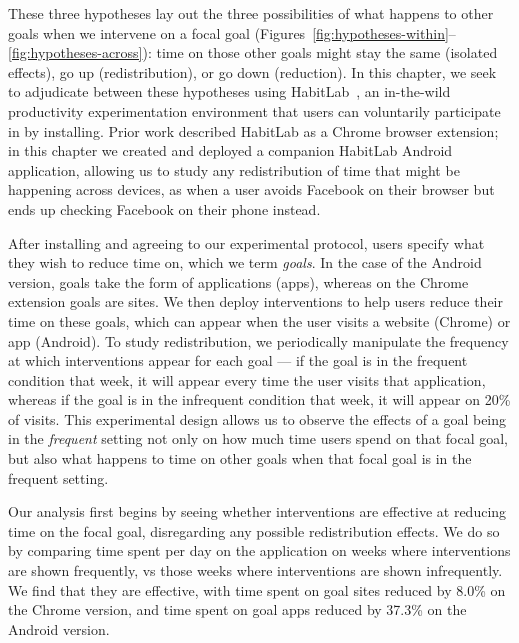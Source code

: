 These three hypotheses lay out the three possibilities of what happens to other goals when we intervene on a focal goal (Figures~\ref{fig:hypotheses-within}--\ref{fig:hypotheses-across}): time on those other goals might stay the same (isolated effects), go up (redistribution), or go down (reduction). In this chapter, we seek to adjudicate between these hypotheses using  HabitLab~\cite{habitlab}, an in-the-wild productivity experimentation environment that users can voluntarily participate in by installing. Prior work described HabitLab as a Chrome browser extension; in this chapter we created and deployed a companion HabitLab Android application, allowing us to study any redistribution of time that might be happening across devices, as when a user avoids Facebook on their browser but ends up checking Facebook on their phone instead.

After installing and agreeing to our experimental protocol, users specify what they wish to reduce time on, which we term \emph{goals}. In the case of the Android version, goals take the form of applications (apps), whereas on the Chrome extension goals are sites.
We then deploy interventions to help users reduce their time on these goals, which can appear when the user visits a website (Chrome) or app (Android). To study redistribution, we periodically manipulate  the frequency at which interventions appear for each goal --- if the goal is in the frequent condition that week, it will appear every time the user visits that application, whereas if the goal is in the infrequent condition that week, it will appear on 20\% of visits. This experimental design allows us to observe the effects of a goal being in the \textit{frequent} setting not only on how much time users spend on that focal goal, but also what happens to time on other goals when that focal goal is in the frequent setting.


Our analysis first begins by seeing whether interventions are effective at reducing time on the focal goal, disregarding any possible redistribution effects. We do so by comparing time spent per day on the application on weeks where interventions are shown frequently, vs those weeks where interventions are shown infrequently. We find that they are effective, with time spent on goal sites reduced by 8.0\% on the Chrome version, and time spent on goal apps reduced by 37.3\% on the Android version.

